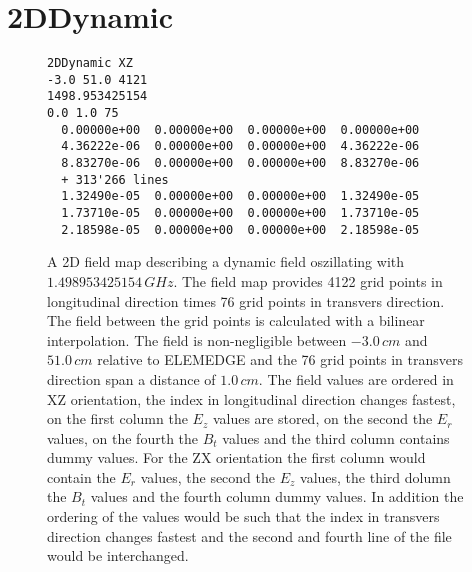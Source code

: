 \section{2DDynamic}
\label{sec:2DDynamic}
\begin{figure}[h]
\label{fig:2DDynamic}
\begin{fmpage}
\begin{verbatim}
2DDynamic XZ
-3.0 51.0 4121
1498.953425154
0.0 1.0 75
  0.00000e+00  0.00000e+00  0.00000e+00  0.00000e+00  
  4.36222e-06  0.00000e+00  0.00000e+00  4.36222e-06  
  8.83270e-06  0.00000e+00  0.00000e+00  8.83270e-06  
  + 313'266 lines                                   
  1.32490e-05  0.00000e+00  0.00000e+00  1.32490e-05  
  1.73710e-05  0.00000e+00  0.00000e+00  1.73710e-05  
  2.18598e-05  0.00000e+00  0.00000e+00  2.18598e-05  
\end{verbatim}
\end{fmpage}
\caption[Example of a 2DDynamic field map]{A 2D field map describing a dynamic field oszillating with $1.498953425154\,GHz$. The field map provides 4122 grid points in longitudinal direction times 76 grid points in transvers direction. The field between the grid points is calculated with a bilinear interpolation. The field is non-negligible between $-3.0\,cm$ and $51.0\,cm$ relative to ELEMEDGE and the 76 grid points in transvers direction span a distance of $1.0\,cm$. The field values are ordered in XZ orientation, the index in longitudinal direction changes fastest, on the first column the $E_z$ values are stored, on the second the $E_r$ values, on the fourth the $B_t$ values and the third column contains dummy values. For the ZX orientation the first column would contain the $E_r$ values, the second the $E_z$ values, the third dolumn the $B_t$ values and the fourth column dummy values. In addition the ordering of the values would be such that the index in transvers direction changes fastest and the second and fourth line of the file would be interchanged.}
\end{figure}
\clearpage

